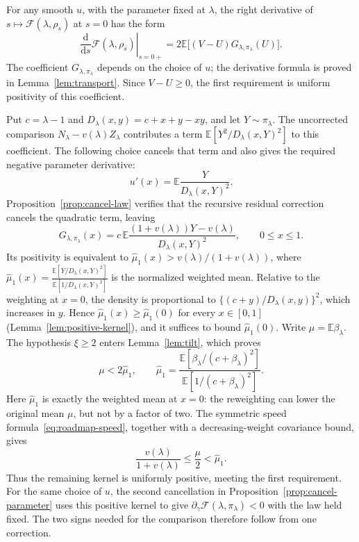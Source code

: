 \documentclass[11pt,reqno]{amsart}
\theoremstyle{plain}
\theoremstyle{definition}
\theoremstyle{remark}
\numberwithin{equation}{section}
\newcommand{\E}{\mathbb E}
\newcommand{\cF}{\mathcal F}
\begin{document}
For any smooth $u$, with the parameter fixed at $\lambda$, the right
derivative of $s\mapsto\cF(\lambda,\rho_s)$ at $s=0$ has the form
\[
 \left.\frac{\mathrm d}{\mathrm ds}\cF(\lambda,\rho_s)\right|_{s=0+}
 =2\E\bigl[(V-U)G_{\lambda,\pi_\lambda}(U)\bigr].
\]
The coefficient $G_{\lambda,\pi_\lambda}$ depends on the choice of $u$;
the derivative formula is proved in Lemma~\ref{lem:transport}.
Since $V-U\ge0$, the first requirement is uniform positivity of this
coefficient.

Put $c=\lambda-1$ and $D_\lambda(x,y)=c+x+y-xy$, and let $Y\sim\pi_\lambda$.
The uncorrected comparison $N_\lambda-v(\lambda)Z_\lambda$ contributes a term
$\E[Y^2/D_\lambda(x,Y)^2]$ to this coefficient. The following choice
cancels that term and also gives the required negative parameter derivative:
\begin{equation}\label{eq:roadmap-corrector}
 u'(x)=\E\frac{Y}{D_\lambda(x,Y)^2}.
\end{equation}
Proposition~\ref{prop:cancel-law} verifies that the recursive residual
correction cancels the quadratic term, leaving
\[
 G_{\lambda,\pi_\lambda}(x)
 =c\,\E\frac{(1+v(\lambda))Y-v(\lambda)}{D_\lambda(x,Y)^2},
 \qquad 0\le x\le1.
\]
Its positivity is equivalent to
$\widehat\mu_1(x)>v(\lambda)/(1+v(\lambda))$, where
$\widehat\mu_1(x)=\frac{\E[Y/D_\lambda(x,Y)^2]}{\E[1/D_\lambda(x,Y)^2]}$
is the normalized weighted mean. Relative to the weighting at $x=0$,
the density is proportional to $\{(c+y)/D_\lambda(x,y)\}^2$, which
increases in $y$. Hence $\widehat\mu_1(x)\ge\widehat\mu_1(0)$ for
every $x\in[0,1]$ (Lemma~\ref{lem:positive-kernel}), and it suffices to
bound $\widehat\mu_1(0)$. Write $\mu=\E\beta_\lambda$. The hypothesis $\xi\ge2$ enters
Lemma~\ref{lem:tilt}, which proves
\begin{equation}\label{eq:roadmap-tilt}
 \mu<2\widehat\mu_1,
 \qquad
 \widehat\mu_1=\frac{\E[\beta_\lambda/(c+\beta_\lambda)^2]}
         {\E[1/(c+\beta_\lambda)^2]}.
\end{equation}
Here $\widehat\mu_1$ is exactly the weighted mean at $x=0$: the reweighting
can lower the original mean $\mu$, but not by a factor of two.
The symmetric speed formula~\eqref{eq:roadmap-speed}, together with a
decreasing-weight covariance bound, gives
\[
 \frac{v(\lambda)}{1+v(\lambda)}\le\frac\mu2<\widehat\mu_1.
\]
Thus the remaining kernel is uniformly positive, meeting the first
requirement. For the same choice of $u$, the second cancellation in
Proposition~\ref{prop:cancel-parameter} uses this positive kernel to give
$\partial_\gamma\cF(\lambda,\pi_\lambda)<0$ with the law held fixed.
The two signs needed for the comparison therefore follow from one correction.
\end{document}

